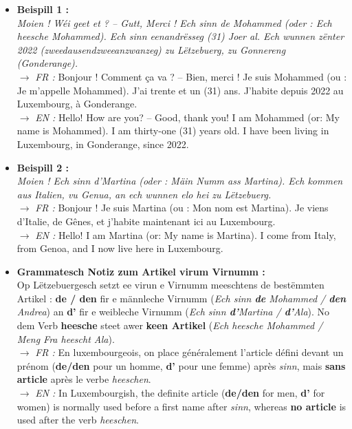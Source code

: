 \begin{itemize}
    \item \textbf{Beispill 1 :} \\
    \textit{Moien ! Wéi geet et ? -- Gutt, Merci ! Ech sinn de Mohammed (oder : Ech heesche Mohammed). Ech sinn eenandrësseg (31) Joer al. Ech wunnen zënter 2022 (zweedausendzweeanzwanzeg) zu Lëtzebuerg, zu Gonnereng (Gonderange).} \\
    $\rightarrow$ \textit{FR :} Bonjour ! Comment ça va ? -- Bien, merci ! Je suis Mohammed (ou : Je m'appelle Mohammed). J'ai trente et un (31) ans. J'habite depuis 2022 au Luxembourg, à Gonderange. \\
    $\rightarrow$ \textit{EN :} Hello! How are you? -- Good, thank you! I am Mohammed (or: My name is Mohammed). I am thirty-one (31) years old. I have been living in Luxembourg, in Gonderange, since 2022.

    \vspace{0.3em}

    \item \textbf{Beispill 2 :} \\
    \textit{Moien ! Ech sinn d'Martina (oder : Mäin Numm ass Martina). Ech kommen aus Italien, vu Genua, an ech wunnen elo hei zu Lëtzebuerg.} \\
    $\rightarrow$ \textit{FR :} Bonjour ! Je suis Martina (ou : Mon nom est Martina). Je viens d'Italie, de Gênes, et j'habite maintenant ici au Luxembourg. \\
    $\rightarrow$ \textit{EN :} Hello! I am Martina (or: My name is Martina). I come from Italy, from Genoa, and I now live here in Luxembourg.

    \vspace{0.3em}

    \item \textbf{Grammatesch Notiz zum Artikel virum Virnumm :} \\
    Op Lëtzebuergesch setzt ee virun e Virnumm meeschtens de bestëmmten Artikel : \textbf{de / den} fir e männleche Virnumm (\textit{Ech sinn \textbf{de} Mohammed / \textbf{den} Andrea}) an \textbf{d'} fir e weibleche Virnumm (\textit{Ech sinn \textbf{d'}Martina / \textbf{d'}Ala}). No dem Verb \textbf{heesche} steet awer \textbf{keen Artikel} (\textit{Ech heesche Mohammed / Meng Fra heescht Ala}). \\
    $\rightarrow$ \textit{FR :} En luxembourgeois, on place généralement l'article défini devant un prénom (\textbf{de/den} pour un homme, \textbf{d'} pour une femme) après \textit{sinn}, mais \textbf{sans article} après le verbe \textit{heeschen}. \\
    $\rightarrow$ \textit{EN :} In Luxembourgish, the definite article (\textbf{de/den} for men, \textbf{d'} for women) is normally used before a first name after \textit{sinn}, whereas \textbf{no article} is used after the verb \textit{heeschen}.
\end{itemize}

